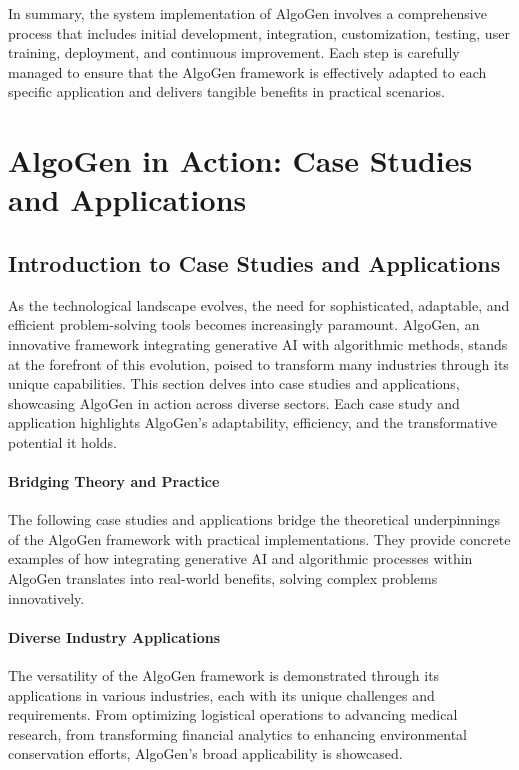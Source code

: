 \documentclass{article}
\begin{document}
In summary, the system implementation of AlgoGen involves a comprehensive process that includes initial development, integration, customization, testing, user training, deployment, and continuous improvement. Each step is carefully managed to ensure that the AlgoGen framework is effectively adapted to each specific application and delivers tangible benefits in practical scenarios.




\section{AlgoGen in Action: Case Studies and Applications}

\subsection{Introduction to Case Studies and Applications}
As the technological landscape evolves, the need for sophisticated, adaptable, and efficient problem-solving tools becomes increasingly paramount. AlgoGen, an innovative framework integrating generative AI with algorithmic methods, stands at the forefront of this evolution, poised to transform many industries through its unique capabilities. This section delves into case studies and applications, showcasing AlgoGen in action across diverse sectors. Each case study and application highlights AlgoGen's adaptability, efficiency, and the transformative potential it holds.

\paragraph{Bridging Theory and Practice}
The following case studies and applications bridge the theoretical underpinnings of the AlgoGen framework with practical implementations. They provide concrete examples of how integrating generative AI and algorithmic processes within AlgoGen translates into real-world benefits, solving complex problems innovatively.

\paragraph{Diverse Industry Applications}
The versatility of the AlgoGen framework is demonstrated through its applications in various industries, each with its unique challenges and requirements. From optimizing logistical operations to advancing medical research, from transforming financial analytics to enhancing environmental conservation efforts, AlgoGen's broad applicability is showcased.
\end{document}
